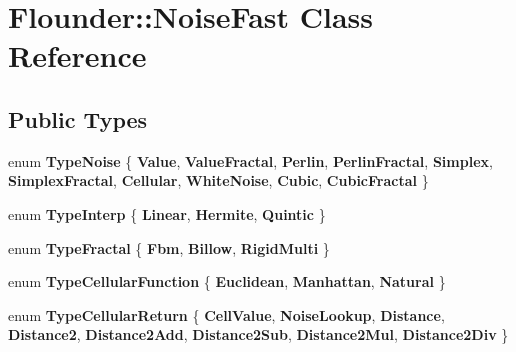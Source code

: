 \hypertarget{class_flounder_1_1_noise_fast}{}\section{Flounder\+:\+:Noise\+Fast Class Reference}
\label{class_flounder_1_1_noise_fast}
\subsection*{Public Types}
\begin{DoxyCompactItemize}
\item 
\mbox{\label{class_flounder_1_1_noise_fast_a40cd51d76401eb2ba94c15e6d40aeadb}} 
enum {\bfseries Type\+Noise} \{ \newline
{\bfseries Value}, 
{\bfseries Value\+Fractal}, 
{\bfseries Perlin}, 
{\bfseries Perlin\+Fractal}, 
\newline
{\bfseries Simplex}, 
{\bfseries Simplex\+Fractal}, 
{\bfseries Cellular}, 
{\bfseries White\+Noise}, 
\newline
{\bfseries Cubic}, 
{\bfseries Cubic\+Fractal}
 \}
\item 
\mbox{\label{class_flounder_1_1_noise_fast_abef38b35a37344b561dcfd22b257a91c}} 
enum {\bfseries Type\+Interp} \{ {\bfseries Linear}, 
{\bfseries Hermite}, 
{\bfseries Quintic}
 \}
\item 
\mbox{\label{class_flounder_1_1_noise_fast_aa6a4ae7bd1013d86378fdbd7906fd087}} 
enum {\bfseries Type\+Fractal} \{ {\bfseries Fbm}, 
{\bfseries Billow}, 
{\bfseries Rigid\+Multi}
 \}
\item 
\mbox{\label{class_flounder_1_1_noise_fast_a52f3ee45423a95b49ec1428af110cc72}} 
enum {\bfseries Type\+Cellular\+Function} \{ {\bfseries Euclidean}, 
{\bfseries Manhattan}, 
{\bfseries Natural}
 \}
\item 
\mbox{\label{class_flounder_1_1_noise_fast_a09c1eff9c8a51508b6a573a47f9190cd}} 
enum {\bfseries Type\+Cellular\+Return} \{ \newline
{\bfseries Cell\+Value}, 
{\bfseries Noise\+Lookup}, 
{\bfseries Distance}, 
{\bfseries Distance2}, 
\newline
{\bfseries Distance2\+Add}, 
{\bfseries Distance2\+Sub}, 
{\bfseries Distance2\+Mul}, 
{\bfseries Distance2\+Div}
 \}
\end{DoxyCompactItemize}
